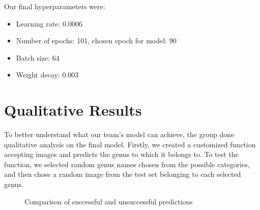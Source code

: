 \documentclass{article} %
\begin{document}
Our final hyperparameters were:
\begin{itemize}
    \item Learning rate: 0.0006
    \item Number of epochs: 101, chosen epoch for model: 90
    \item Batch size: 64
    \item Weight decay: 0.003
\end{itemize}

\section{Qualitative Results}
\label{sec:qualitative_results}

To better understand what our team's model can achieve, the group done qualitative analysis on the final model. Firstly, we created a customized function accepting images and predicts the genus to which it belongs to. To test the function, we selected random genus names chosen from the possible categories, and then chose a random image from the test set belonging to each selected genus.

\FloatBarrier
\begin{figure}[h]
    \centering
    \hfill
    \caption{Comparison of successful and unsuccessful predictions}
    \label{fig:sideBySideGraphs}
\end{figure}
\FloatBarrier
\end{document}
